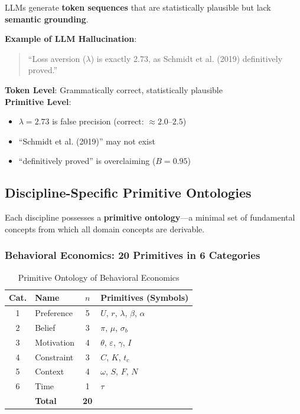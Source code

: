 \documentclass[11pt,a4paper]{article}
\begin{document}
\begin{warningbox}[title={The Token Illusion Problem}]
LLMs generate \textbf{token sequences} that are statistically plausible but lack \textbf{semantic grounding}.

\textbf{Example of LLM Hallucination}:
\begin{quote}
``Loss aversion ($\lambda$) is exactly 2.73, as Schmidt et al. (2019) definitively proved.''
\end{quote}

\textbf{Token Level}: Grammatically correct, statistically plausible \\
\textbf{Primitive Level}:
\begin{itemize}
    \item $\lambda = 2.73$ is false precision (correct: $\approx 2.0$--$2.5$)
    \item ``Schmidt et al. (2019)'' may not exist
    \item ``definitively proved'' is overclaiming ($B = 0.95$)
\end{itemize}
\end{warningbox}

\subsection{Discipline-Specific Primitive Ontologies}

Each discipline possesses a \textbf{primitive ontology}---a minimal set of fundamental concepts from which all domain concepts are derivable.

\subsubsection{Behavioral Economics: 20 Primitives in 6 Categories}

\begin{table}[h]
\centering
\caption{Primitive Ontology of Behavioral Economics}
\label{tab:primitive-be}
\begin{tabular}{clcl}
\toprule
\textbf{Cat.} & \textbf{Name} & \textbf{$n$} & \textbf{Primitives (Symbols)} \\
\midrule
1 & Preference & 5 & $U$, $r$, $\lambda$, $\beta$, $\alpha$ \\
2 & Belief & 3 & $\pi$, $\mu$, $\sigma_b$ \\
3 & Motivation & 4 & $\theta$, $\varepsilon$, $\gamma$, $I$ \\
4 & Constraint & 3 & $C$, $K$, $t_c$ \\
5 & Context & 4 & $\omega$, $S$, $F$, $N$ \\
6 & Time & 1 & $\tau$ \\
\midrule
& \textbf{Total} & \textbf{20} & \\
\bottomrule
\end{tabular}
\end{table}
\end{document}
